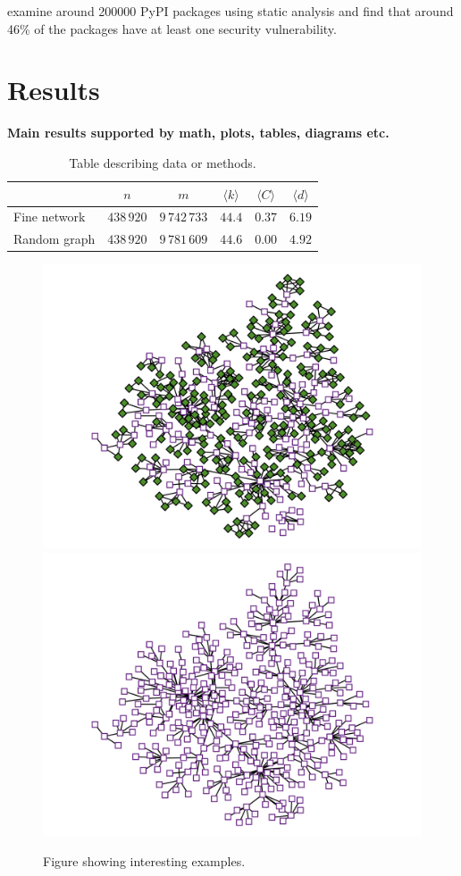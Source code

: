 \documentclass[9pt,twocolumn,twoside]{pnas-report}
\begin{document}
\cite{ruohonen2021} examine around 200000 PyPI packages using static analysis and find that around 46\% of the packages have at least one security vulnerability.


\nocite{Kle00,Bou05,EB07,New08,For10,New12,FH16,PLC17,PDL18,Pei20}

\section*{Results}

{\bf Main results supported by math, plots, tables, diagrams etc.}
\lipsum[1]

\begin{table}[h]\centering%
	\caption{Table describing data or methods.}
	\begin{tabular}{lccccc}\toprule
	    & $n$ & $m$ & $\langle k\rangle$ & $\langle C\rangle$ & $\langle d\rangle$ \\\midrule
	    Fine network & $438\,920$ & $9\,742\,733$ & $44.4$ & $0.37$ & $6.19$ \\
	    Random graph & $438\,920$ & $9\,781\,609$ & $44.6$ & $0.00$ & $4.92$ \\\bottomrule
	\end{tabular}
	\label{tbl:example}
\end{table}

\lipsum[2-3]

\begin{figure}[t]\centering%
	\includegraphics[width=0.49\linewidth]{example1}
	\includegraphics[width=0.49\linewidth]{example2}
	\caption{Figure showing interesting examples.~\cite{Sub18a}}
\end{figure}
\end{document}
